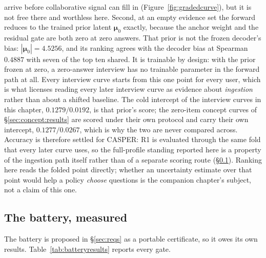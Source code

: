 \documentclass[11pt]{article}
\newcommand{\bmu}{\boldsymbol{\mu}}
\begin{document}
arrive before collaborative signal can fill in (Figure~\ref{fig:gradedcurve}), but it is not free there and
worthless here.
Second, at an empty evidence set the forward reduces to the
trained prior latent $\bmu_0$ exactly, because the anchor weight and the residual gate are both zero at zero
answers. That prior is not the frozen decoder's bias: $|\bmu_0|=4.5256$, and its ranking agrees with the decoder
bias at Spearman $0.4887$ with seven of the top ten shared. It is trainable by design: with the prior frozen at
zero, a zero-answer interview has no trainable parameter in the forward path at all. Every interview curve starts
from this one point for every user, which is what licenses reading every later interview curve as evidence about
\emph{ingestion} rather than about a shifted baseline. The cold intercept of the interview curves in this chapter, $0.1279/0.0192$, is that prior's
score; the zero-item concept curves of \S\ref{sec:concept:results} are scored under
their own protocol and carry their own intercept, $0.1277/0.0267$, which is why the two are never
compared across.
Accuracy is therefore settled for CASPER: R1 is evaluated through the same fold that every later
curve uses, so the full-profile standing reported here is a property of the ingestion path itself rather
than of a separate scoring route (\S\ref{sec:batteryresults}). Ranking here reads the folded point directly; whether an uncertainty estimate over
that point would help a policy \emph{choose} questions is the companion chapter's subject, not a claim of this one.

\subsection{The battery, measured}\label{sec:batteryresults}

The battery is proposed in \S\ref{sec:reqs} as a portable certificate, so it owes its own results.
Table~\ref{tab:batteryresults} reports every gate. 
\end{document}
